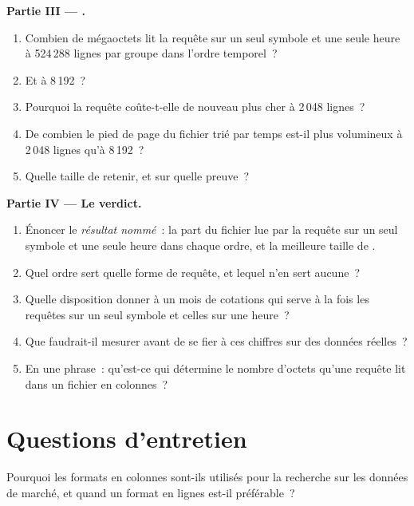 \begin{problem}
\medskip\noindent\textbf{Partie III --- .}
\begin{enumerate}[resume]
\item Combien de mégaoctets lit la requête sur un seul symbole et une seule heure à 524\,288 lignes par groupe dans l'ordre temporel~?
\item Et à 8\,192~?
\item Pourquoi la requête coûte-t-elle de nouveau plus cher à 2\,048 lignes~?
\item De combien le pied de page du fichier trié par temps est-il plus volumineux à 2\,048 lignes qu'à 8\,192~?
\item Quelle taille de  retenir, et sur quelle preuve~?
\end{enumerate}

\medskip\noindent\textbf{Partie IV --- Le verdict.}
\begin{enumerate}[resume]
\item Énoncer le \emph{résultat nommé}~: la part du fichier lue par la requête sur un seul symbole et une seule heure dans chaque ordre, et la meilleure
taille de .
\item Quel ordre sert quelle forme de requête, et lequel n'en sert aucune~?
\item Quelle disposition donner à un mois de cotations qui serve à la fois les requêtes sur un seul symbole et celles sur une heure~?
\item Que faudrait-il mesurer avant de se fier à ces chiffres sur des données réelles~?
\item En une phrase~: qu'est-ce qui détermine le nombre d'octets qu'une requête lit dans un fichier en colonnes~?
\end{enumerate}
\end{problem}

\section{Questions d'entretien}

\begin{interviewq}\label{iq:pl:columnar-formats:1}
Pourquoi les formats en colonnes sont-ils utilisés pour la recherche sur les données de marché, et quand un format en lignes est-il préférable~?
\end{interviewq}

